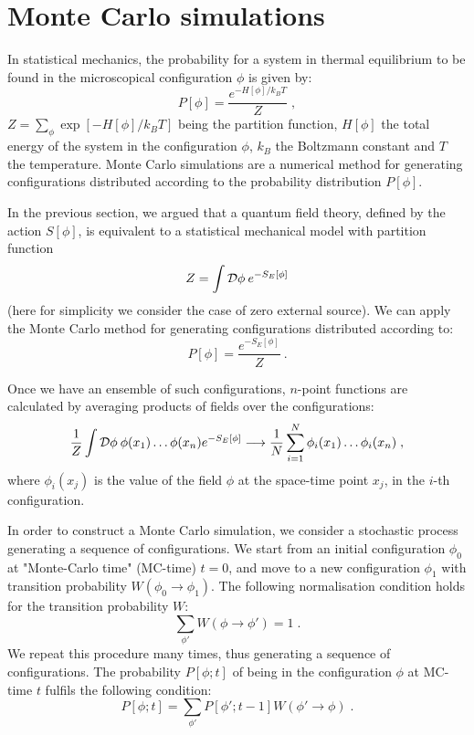
\section{Monte Carlo simulations}

In statistical mechanics, the probability for a system in thermal equilibrium to be found in the microscopical configuration $\phi$ is given by:
\begin{equation}
P[\phi] = \frac{e^{-H[\phi]/k_B T}}{Z} \; ,
\end{equation}
%
$Z=\sum_{\phi} \exp[-H[\phi]/k_B T]$ being the partition function, $H[\phi]$ the total energy of the system in the configuration $\phi$, $k_B$ the Boltzmann constant and $T$ the temperature. Monte Carlo simulations are a numerical method for generating configurations distributed according to the probability distribution $P[\phi]$.

In the previous section, we argued that a quantum field theory, defined by the action $
S[\phi]$, is equivalent to a statistical mechanical model with partition function
\begin{equation}
Z = \int \mathcal D \phi \: e^{- S_E[\phi]}
\end{equation}
%
(here for simplicity we consider the case of zero external source). We can apply the Monte Carlo method for generating configurations distributed according to:
\begin{equation}
P[\phi] = \frac{e^{-S_E[\phi]}}{Z} \: .
\label{Boltz_dist}
\end{equation}


Once we have an ensemble of such configurations, $n$-point functions are calculated by averaging products of fields over the configurations:
\begin{equation}
\frac{1}{Z} \int \mathcal D \phi \: \phi(x_1) \dots \phi(x_n) e^{ -S_E[\phi]} \longrightarrow \frac{1}{N}\sum_{i=1}^N \phi_i(x_1) \dots \phi_i(x_n) \; ,
\label{n_point_f}
\end{equation}
%
where $\phi_i(x_j)$ is the value of the field $\phi$ at the space-time point $x_j$, in the $i$-th configuration. 


In order to construct a Monte Carlo simulation, we consider a stochastic process generating a sequence of configurations.  We start from an initial configuration $\phi_0$ at "Monte-Carlo time" (MC-time) $t = 0$, and move to a new configuration $\phi_1$ with transition probability $W(\phi_0 \to \phi_1)$. The following normalisation condition holds for the transition probability $W$:
\begin{equation}
\sum_{\phi'} W(\phi \to \phi') = 1 \; .
\label{prob_norm}
\end{equation}
%
We repeat this procedure many times, thus generating a sequence of configurations. The probability $P[\phi; t]$ of being in the configuration $\phi$ at MC-time $t$ fulfils the following condition:
\begin{equation}
P[\phi; t] = \sum_{\phi'} P[\phi'; t-1] W(\phi' \to \phi) \; .
\label{prob_evolution}
\end{equation}

